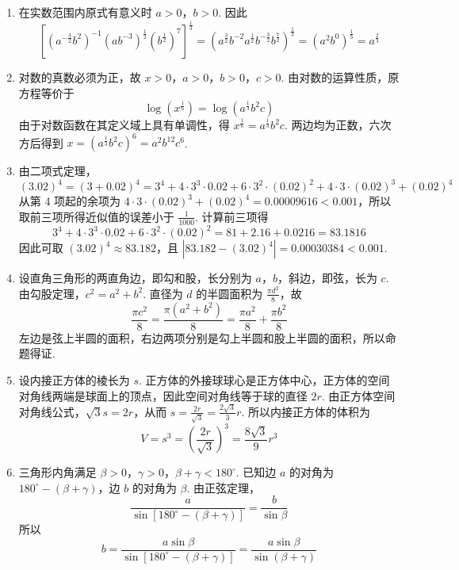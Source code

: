 \begin{solution}
\begin{enumerate}
\item 在实数范围内原式有意义时 \(a>0\)，\(b>0\). 因此
\[
\left[\left(a^{-\frac{3}{2}}b^{2}\right)^{-1}\left(ab^{-3}\right)^{\frac{1}{2}}\left(b^{\frac{1}{2}}\right)^{7}\right]^{\frac{1}{3}}
=\left(a^{\frac{3}{2}}b^{-2}a^{\frac{1}{2}}b^{-\frac{3}{2}}b^{\frac{7}{2}}\right)^{\frac{1}{3}}
=\left(a^{2}b^{0}\right)^{\frac{1}{3}}=a^{\frac{2}{3}}
\]

\item 对数的真数必须为正，故 \(x>0\)，\(a>0\)，\(b>0\)，\(c>0\). 由对数的运算性质，原方程等价于
\[
\log\left(x^{\frac{1}{6}}\right)=\log\left(a^{\frac{1}{3}}b^{2}c\right)
\]
由于对数函数在其定义域上具有单调性，得 \(x^{\frac{1}{6}}=a^{\frac{1}{3}}b^{2}c\). 两边均为正数，六次方后得到 \(x=\left(a^{\frac{1}{3}}b^{2}c\right)^{6}=a^{2}b^{12}c^{6}\).

\item 由二项式定理，
\[
\left(3.02\right)^{4}=\left(3+0.02\right)^{4}
=3^{4}+4\cdot3^{3}\cdot0.02+6\cdot3^{2}\cdot\left(0.02\right)^{2}
+4\cdot3\cdot\left(0.02\right)^{3}+\left(0.02\right)^{4}
\]
从第 4 项起的余项为 \(4\cdot3\cdot\left(0.02\right)^{3}+\left(0.02\right)^{4}=0.00009616<0.001\)，所以取前三项所得近似值的误差小于 \(\frac{1}{1000}\). 计算前三项得
\[
3^{4}+4\cdot3^{3}\cdot0.02+6\cdot3^{2}\cdot\left(0.02\right)^{2}=81+2.16+0.0216=83.1816
\]
因此可取 \(\left(3.02\right)^{4}\approx83.182\)，且 \(\left|83.182-\left(3.02\right)^{4}\right|=0.00030384<0.001\).

\item 设直角三角形的两直角边，即勾和股，长分别为 \(a\)，\(b\)，斜边，即弦，长为 \(c\). 由勾股定理，\(c^{2}=a^{2}+b^{2}\). 直径为 \(d\) 的半圆面积为 \(\frac{\pi d^{2}}{8}\)，故
\[
\frac{\pi c^{2}}{8}=\frac{\pi\left(a^{2}+b^{2}\right)}{8}=\frac{\pi a^{2}}{8}+\frac{\pi b^{2}}{8}
\]
左边是弦上半圆的面积，右边两项分别是勾上半圆和股上半圆的面积，所以命题得证.

\item 设内接正方体的棱长为 \(s\). 正方体的外接球球心是正方体中心，正方体的空间对角线两端是球面上的顶点，因此空间对角线等于球的直径 \(2r\). 由正方体空间对角线公式，\(\sqrt{3}s=2r\)，从而 \(s=\frac{2r}{\sqrt{3}}=\frac{2\sqrt{3}}{3}r\). 所以内接正方体的体积为
\[
V=s^{3}=\left(\frac{2r}{\sqrt{3}}\right)^{3}=\frac{8\sqrt{3}}{9}r^{3}
\]

\item 三角形内角满足 \(\beta>0\)，\(\gamma>0\)，\(\beta+\gamma<180^{\circ}\). 已知边 \(a\) 的对角为 \(180^{\circ}-\left(\beta+\gamma\right)\)，边 \(b\) 的对角为 \(\beta\). 由正弦定理，
\[
\frac{a}{\sin\left[180^{\circ}-\left(\beta+\gamma\right)\right]}=\frac{b}{\sin\beta}
\]
所以
\[
b=\frac{a\sin\beta}{\sin\left[180^{\circ}-\left(\beta+\gamma\right)\right]}=\frac{a\sin\beta}{\sin\left(\beta+\gamma\right)}
\]
\end{enumerate}
\end{solution}

